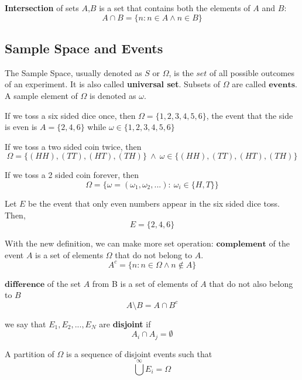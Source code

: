 \textbf{Intersection} of sets $A$,$B$ is a set that contains both the elements of $A$ and $B$:
$$A \cap B = \{n:n \in A  \land  n  \in B\}$$

\par






\subsection*{Sample Space and Events}
The Sample Space, usually denoted as $S$ or $\Omega$, is the $\textit{set}$ of all possible outcomes of an experiment. It is also called  \textbf{universal set}. Subsets of $\Omega$ are called $\textbf{events}$. A sample element of $\Omega$ is denoted as $\omega$.

\begin{example}
    If we toss a six sided dice once, then $\Omega = \{1,2,3,4,5,6\}$, the event that the side is even is $A= \{2,4,6\}$ while $\omega \in \{1,2,3,4,5,6\}$
\end{example}

\begin{example}
    If we toss a two sided coin twice, then $$\Omega = \{(HH),(TT),(HT),(TH)\} \ \land \ \omega \in \{(HH),(TT),(HT),(TH)\}$$
\end{example}
\begin{example}
    If we toss a 2 sided coin forever, then $$\Omega = \{\omega= (\omega_1,\omega_2,...): \ \omega_i \in \{H,T\} \}$$
\end{example}

\begin{example}
    Let $E$ be the event that only even numbers appear in the six sided dice toss. Then,
    $$E = \{2,4,6 \}$$
\end{example}
With the new definition, we can make more set operation: 
$\textbf{complement}$ of the event $A$ is a set of elements $\Omega$ that do not belong to $A$. 
$$A^{c} = \{n: n \in \Omega \land n \not\in A \}$$
\par
$\textbf{difference}$ of the set $A$ from B is a set of elements of $A$ that do not also belong to $B$
$$A \setminus B = A \cap B^c$$
\par we say that $E_1,E_2,...,E_N$ are \textbf{disjoint} if 
$$A_i \cap A_j =  \emptyset $$
\par
A partition of $\Omega$ is a sequence of disjoint events  such that $$\bigcup^{\infty} E_i = \Omega$$

\par 

